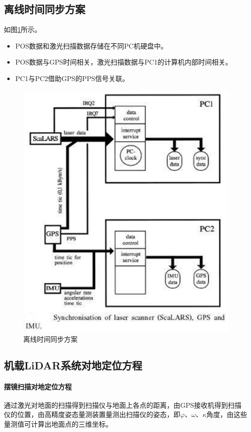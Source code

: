 \subsection{离线时间同步方案}如图\ref{fig:离线时间同步方案}所示。
\begin{itemize}
	\item POS数据和激光扫描数据存储在不同PC机硬盘中。
	\item POS数据与GPS时间相关，激光扫描数据与PC1的计算机内部时间相关。
	\item PC1与PC2借助GPS的PPS信号关联。
\end{itemize}
\begin{figure}[htbp]
	\centering
	\includegraphics[width=0.5\linewidth]{figure/Chapter3/离线时间同步方案}
	\caption{离线时间同步方案}
	\label{fig:离线时间同步方案}
\end{figure}

\subsection{机载LiDAR系统对地定位方程}

\paragraph{摆镜扫描对地定位方程}通过激光对地面的扫描得到扫描仪与地面上各点的距离，由GPS接收机得到扫描仪的位置，由高精度姿态量测装置量测出扫描仪的姿态，即$ φ $、$ ω $、$ κ $角度，由这些量测值可计算出地面点的三维坐标。

